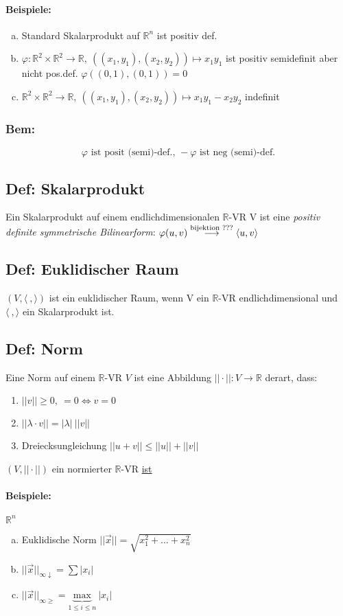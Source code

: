 \documentclass[titlepage,12pt,a4paper,ngerman]{report}
\newcommand{\tx}[1]{\textrm{#1}}
\begin{document}
\paragraph{Beispiele:} 
\begin{enumerate}[(a)]
	\item Standard Skalarprodukt auf $\mathbb R^n$ ist positiv def.
	\item $\varphi: \mathbb R^2 \times \mathbb R^2 \to \mathbb R,\ ((x_1,y_1),(x_2,y_2)) \mapsto x_1 y_1$ ist positiv semidefinit aber nicht pos.def. $\varphi ((0,1),(0,1)) = 0$
	\item $\mathbb R^2 \times \mathbb R^2 \to \mathbb R,\ ((x_1,y_1),(x_2,y_2)) \mapsto x_1y_1  - x_2y_2$ indefinit
\end{enumerate}
\subsubsection*{Bem:}  
$$\varphi \tx{ ist posit (semi)-def., } -\varphi \tx{ ist neg (semi)-def.}$$
\subsection{Def: Skalarprodukt}
Ein Skalarprodukt auf einem endlichdimensionalen $ \mathbb{R} $-VR V ist eine \emph{positiv definite symmetrische Bilinearform}: $ \varphi(u,v) \buildrel \tx{bijektion ???} \over \longrightarrow \langle u,v \rangle $
\subsection{Def: Euklidischer Raum}
$ (V,\langle \ , \rangle ) $ ist ein euklidischer Raum, wenn V ein $ \mathbb{R} $-VR endlichdimensional  und $ \langle \ , \rangle $ ein Skalarprodukt ist.
\subsection{Def: Norm}
Eine Norm auf einem $\mathbb R$-VR $V$ ist eine Abbildung $||\cdot||: V \to \mathbb R$ derart, dass:
\begin{enumerate}
	\item $||v|| \geq 0,\ = 0 \Leftrightarrow v = 0$
	\item $||\lambda \cdot v|| = |\lambda|\ ||v||$
	\item Dreiecksungleichung $||u + v|| \leq ||u|| + ||v||$
\end{enumerate}
$(V, || \cdot ||)$ ein normierter $\mathbb R$-VR \underline{ist}
\paragraph{Beispiele:} $\mathbb R^n$
\begin{enumerate}[(a)]
	\item Euklidische Norm $||\vec{x}|| = \sqrt{x_1^2+ \dots + x_n^2}$
	\item $||\vec{x}||_{\infty \downarrow} = \sum |x_i|$
	\item $||\vec{x}||_{\infty \geq} = \underbrace{\tx{max}}_{1 \leq i \leq n}\ |x_i|$
\end{enumerate}
\end{document}
